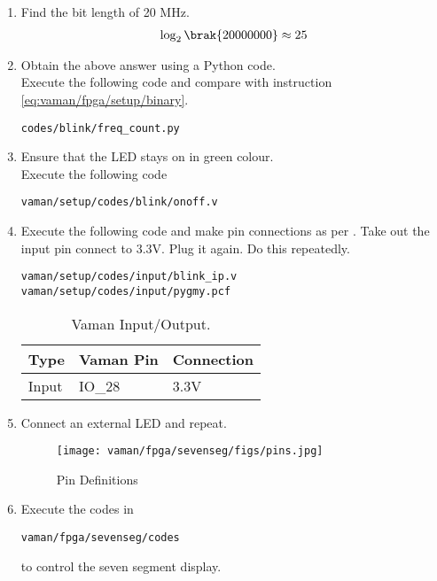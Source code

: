 \begin{enumerate}[label=\arabic*.,ref=\theenumi]
\item Find the bit length of 20 MHz.
\\
\solution 
\begin{align}
\log_2\brak{20000000} \approx 25
\end{align}
\item Obtain the above answer using a Python code.
\\
\solution Execute the following code and compare with instruction  \ref{eq:vaman/fpga/setup/binary}.
\begin{lstlisting}
codes/blink/freq_count.py
\end{lstlisting}
\item Ensure that the LED stays on in green colour.
	\\
\solution  Execute the following code
\begin{lstlisting}
vaman/setup/codes/blink/onoff.v
\end{lstlisting}
\item Execute the following code and make pin connections as per
.
	Take out the input pin connect to 3.3V. Plug it again.
Do this repeatedly.
\begin{lstlisting}
vaman/setup/codes/input/blink_ip.v
vaman/setup/codes/input/pygmy.pcf
\end{lstlisting}
\begin{table}[]
\centering
\begin{tabular}{|l|l|l|}
\hline
Type & Vaman Pin  &  Connection \\ \hline
Input &  IO\_28 &  3.3V \\ \hline
\end{tabular}
\caption{Vaman Input/Output.}
\label{tab:vaman/fpga/setup/input}
\end{table}
\item Connect an external LED and repeat.
%
\begin{figure}[!ht]
\centering
\texttt{[image: vaman/fpga/sevenseg/figs/pins.jpg]}
\caption{Pin Definitions}
\label{fig:vaman/fpga/sevenseg/pins}
\end{figure}
\item  Execute the codes in
\begin{lstlisting}
vaman/fpga/sevenseg/codes
\end{lstlisting}
to control the seven segment display.




\end{enumerate}
